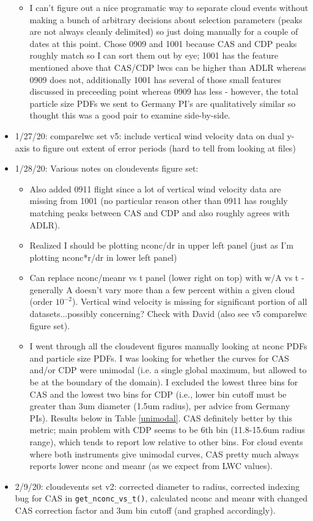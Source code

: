 \documentclass{article}
\begin{document}
\begin{itemize}
\begin{itemize}
			\item I can't figure out a nice programatic way to separate cloud events without making a bunch of arbitrary decisions about selection parameters (peaks are not always cleanly delimited) so just doing manually for a couple of dates at this point. Chose 0909 and 1001 because CAS and CDP peaks roughly match so I can sort them out by eye; 1001 has the feature mentioned above that CAS/CDP lwcs can be higher than ADLR whereas 0909 does not, additionally 1001 has several of those small features discussed in preceeding point whereas 0909 has less - however, the total particle size PDFs we sent to Germany PI's are qualitatively similar so thought this was a good pair to examine side-by-side. 
		\end{itemize}
	\item 1/27/20: comparelwc set v5: include vertical wind velocity data on dual y-axis to figure out extent of error periods (hard to tell from looking at files)
	\item 1/28/20: Various notes on cloudevents figure set:
		\begin{itemize}
			\item Also added 0911 flight since a lot of vertical wind velocity data are missing from 1001 (no particular reason other than 0911 has roughly matching peaks between CAS and CDP and also roughly agrees with ADLR).
			\item Realized I should be plotting nconc/dr in upper left panel (just as I'm plotting nconc*r/dr in lower left panel)
			\item Can replace nconc/meanr vs t panel (lower right on top) with w/A vs t - generally A doesn't vary more than a few percent within a given cloud (order $10^{-2}$). Vertical wind velocity is missing for significant portion of all datasets...possibly concerning? Check with David (also see v5 comparelwc figure set).
			\item I went through all the cloudevent figures manually looking at nconc PDFs and particle size PDFs. I was looking for whether the curves for CAS and/or CDP were unimodal (i.e. a single global maximum, but allowed to be at the boundary of the domain). I excluded the lowest three bins for CAS and the lowest two bins for CDP (i.e., lower bin cutoff must be greater than 3um diameter (1.5um radius), per advice from Germany PIs). Results below in Table \ref{unimodal}. CAS definitely better by this metric; main problem with CDP seems to be 6th bin (11.8-15.6um radius range), which tends to report low relative to other bins. For cloud events where both instruments give unimodal curves, CAS pretty much always reports lower nconc and meanr (as we expect from LWC values).
		\end{itemize}
	\item 2/9/20: cloudevents set v2: corrected diameter to radius, corrected indexing bug for CAS in \texttt{get\_nconc\_vs\_t()}, calculated nconc and meanr with changed CAS correction factor and 3um bin cutoff (and graphed accordingly).\\


\end{itemize}
\end{document}
